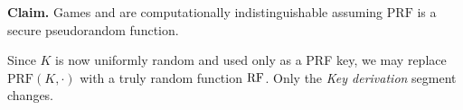 \textbf{Claim.}
  Games  and  are computationally
  indistinguishable assuming $\mathrm{PRF}$ is a secure pseudorandom function.

Since $K$ is now uniformly random and used only as a PRF key, we may replace
$\mathrm{PRF}(K, \cdot)$ with a truly random function $\mathrm{RF}$. Only the
\emph{Key derivation} segment changes.
